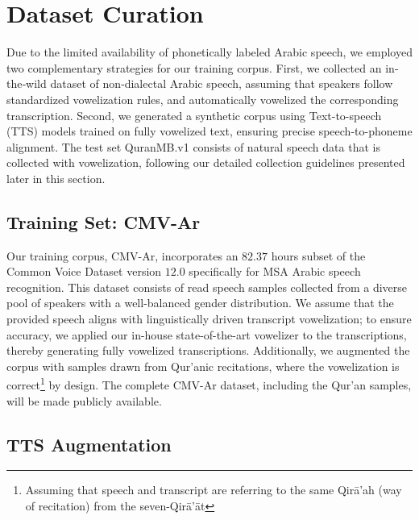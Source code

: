 \documentclass{Interspeech}
\begin{document}
\section{Dataset Curation}


Due to the limited availability of phonetically labeled Arabic speech, %
we employed two complementary strategies for our training corpus. First, we collected an in‐the‐wild dataset of non‐dialectal Arabic speech, assuming that speakers follow standardized vowelization rules, and automatically vowelized the corresponding transcription. Second, we generated a synthetic corpus using Text-to-speech (TTS) models trained on fully vowelized text, ensuring precise speech-to-phoneme alignment. The test set QuranMB.v1 consists of natural speech data that is collected with vowelization, following our detailed collection guidelines presented later in this section.

\subsection{Training Set: CMV-Ar}

Our training corpus, CMV-Ar, incorporates an $82.37$ hours subset of the Common Voice Dataset \cite{ardila2019common} version $12.0$ specifically for MSA Arabic speech recognition. This dataset consists of read speech samples collected from a diverse pool of speakers with a well-balanced gender distribution. We assume that the provided speech aligns with linguistically driven transcript vowelization; to ensure accuracy, we applied our in-house state-of-the-art vowelizer to the transcriptions, thereby generating fully vowelized transcriptions. Additionally, we augmented the corpus with samples drawn from Qur’anic recitations, where the vowelization is correct\footnote{Assuming that speech and transcript are referring to the same Qirā’ah (way of recitation) from the seven-Qirā’āt} by design. The complete CMV-Ar dataset, including the Qur’an samples, will be made publicly available.

\subsection{TTS Augmentation}
\end{document}
